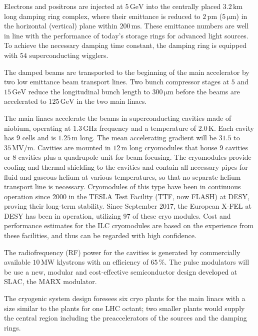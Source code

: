 \documentclass[%
 reprint,
 amsmath,amssymb,
 aps,
]{revtex4-1}
\newcommand{\jim}[1]{\textcolor{black}{#1}}
\begin{document}
Electrons and positrons are injected at $5\,{\mathrm{GeV}}$ into the centrally placed $3.2\,{\mathrm{km}}$ long damping ring complex, where their emittance is reduced to $2\,{\mathrm{pm}}$ ($5\,{\mathrm{\mu m}}$) in the horizontal (vertical) plane within $200\,{\mathrm{ms}}$. 
These emittance numbers are well in line with the performance of today's storage rings for advanced light sources.
To achieve the necessary damping time constant, the damping ring is equipped with $54$ superconducting wigglers. 

The damped beams are transported to the beginning of the main accelerator by two low emittance beam transport lines. Two bunch compressor stages at $5$ and $15\,{\mathrm{GeV}}$ reduce the longitudinal bunch length to $300\,{\mathrm{\mu m}}$ before the beams are accelerated to $125\,{\mathrm{GeV}}$ in the two main linacs.

The main linacs accelerate the beams in superconducting cavities made of niobium, operating at $1.3\,{\mathrm{GHz}}$ frequency and a temperature of $2.0\,{\mathrm{K}}$. 
Each cavity has $9$ cells and is $1.25\,{\mathrm{m}}$ long. The mean accelerating gradient will be $31.5$ to $35\,{\mathrm{MV/m}}$.
Cavities are mounted in $12\,{\mathrm{m}}$ long cryomodules that house $9$ cavities or $8$ cavities plus a quadrupole unit for beam focusing. 
The cryomodules provide cooling and thermal shielding to the cavities and contain all necessary pipes for fluid and gaseous helium at various temperatures, so that no separate helium transport line is necessary.
Cryomodules of this type have been in continuous operation since 2000 in the TESLA Test Facility (TTF, now FLASH) at DESY,  proving their long-term stability. 
Since September 2017, the European X-FEL at DESY has been in operation, utilizing 97 of these cryo modules. 
Cost and performance estimates for the ILC cryomodules are based on the experience from these facilities, and thus can be regarded with high confidence. 

The radiofrequency (RF) power for the cavities is generated by commercially available $10\,{\mathrm{MW}}$ klystrons with an efficiency of $65\,\%$. 
The pulse modulators will be use a new, modular and cost-effective semiconductor design \jim{developed} at SLAC, the MARX modulator.

The cryogenic system design foresees six cryo plants for the main linacs with a size similar to the plants for one LHC octant; 
two smaller plants would supply the central region including the preaccelerators of the sources and the damping rings. 
\end{document}
